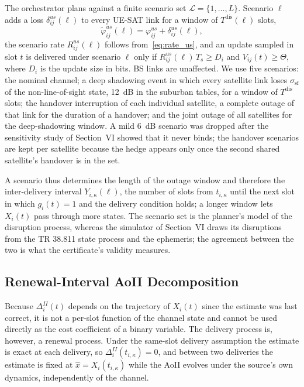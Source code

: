 The orchestrator plans against a finite scenario set $\mathscr{L}=\{1,\ldots,L\}$. Scenario $\ell$ adds a loss
$\delta^{us}_{ij}(\ell)$ to every UE-SAT link for a window of $T^{\mathrm{dis}}(\ell)$ slots,
\begin{equation}
    \tilde{\varphi}^{us}_{ij}(\ell)=\varphi^{us}_{ij}+\delta^{us}_{ij}(\ell),
    \label{eq:realized_pathloss}
\end{equation}
the scenario rate $R^{us}_{ij}(\ell)$ follows from~\eqref{eq:rate_us}, and an update sampled in slot $t$ is delivered
under scenario $\ell$ only if $R^{us}_{ij}(\ell)\,T_s\geq D_i$ and $V_{ij}(t)\geq\Theta$, where $D_i$ is the update
size in bits. BS links are unaffected. We use five scenarios: the nominal channel; a deep shadowing event in which
every satellite link loses $\sigma_{\mathrm{sf}}$ of the non-line-of-sight state, 12~dB in the suburban tables, for a
window of $T^{\mathrm{dis}}$ slots; the handover interruption of each individual satellite, a complete outage of that
link for the duration of a handover; and the joint outage of all satellites for the deep-shadowing window. A mild 6~dB
scenario was dropped after the sensitivity study of Section~VI showed that it never binds; the handover scenarios are
kept per satellite because the hedge appears only once the second shared satellite's handover is in the set.

A scenario thus determines the length of the outage window and therefore the inter-delivery interval
$Y_{i,\kappa}(\ell)$, the number of slots from $t_{i,\kappa}$ until the next slot in which $g_i(t)=1$ and the delivery
condition holds; a longer window lets $X_i(t)$ pass through more states. The scenario set is the planner's model of
the disruption process, whereas the simulator of Section~VI draws its disruptions from the TR 38.811 state process
and the ephemeris; the agreement between the two is what the certificate's validity measures.

\subsection{Renewal-Interval AoII Decomposition}
\label{sec:renewal}

Because $\Delta_i^{II}(t)$ depends on the trajectory of $X_i(t)$ since the estimate was last correct, it is not a
per-slot function of the channel state and cannot be used directly as the cost coefficient of a binary variable. The
delivery process is, however, a renewal process. Under the same-slot delivery assumption the estimate is exact at each
delivery, so $\Delta_i^{II}(t_{i,\kappa})=0$, and between two deliveries the estimate is fixed at
$\hat{x}=X_i(t_{i,\kappa})$ while the AoII evolves under the source's own dynamics, independently of the channel.

